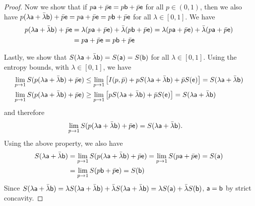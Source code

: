 \begin{mathSection}
\begin{proof}
	Now we show that if  $p\ens[a] + \bar{p} \ens = p \ens[b] + \bar{p} \ens$ for all $p \in (0,1)$, then we also have $p(\lambda\ens[a] + \bar{\lambda}\ens[b]) + \bar{p} \ens = p\ens[a] + \bar{p} \ens = p \ens[b] + \bar{p} \ens$ for all $\lambda \in [0,1]$. We have
	\begin{equation}
		\begin{aligned}
			p(\lambda\ens[a] + \bar{\lambda}\ens[b]) + \bar{p} \ens &= \lambda(p \ens[a] + \bar{p} \ens) + \bar{\lambda}(p\ens[b] + \bar{p} \ens) = \lambda(p \ens[a] + \bar{p} \ens) + \bar{\lambda}(p\ens[a] + \bar{p} \ens) \\
			&= p\ens[a] + \bar{p} \ens = p\ens[b] + \bar{p} \ens 
		\end{aligned}
	\end{equation}
	
	Lastly, we show that $S(\lambda \ens[a] + \bar{\lambda} \ens[b]) = S(\ens[a]) = S(\ens[b])$ for all $\lambda \in [0,1]$. Using the entropy bounds, with $\lambda \in [0,1]$, we have
	\begin{equation}
		\begin{aligned}
			\lim\limits_{p \to 1} S(p(\lambda\ens[a] + \bar{\lambda}\ens[b]) + \bar{p}\ens) &\leq \lim\limits_{p \to 1} \left[ I(p,\bar{p}) + p S(\lambda\ens[a] + \bar{\lambda}\ens[b]) + \bar{p} S(\ens) \right] = S(\lambda\ens[a] + \bar{\lambda}\ens[b]) \\
			\lim\limits_{p \to 1} S(p(\lambda\ens[a] + \bar{\lambda}\ens[b]) + \bar{p}\ens) &\geq \lim\limits_{p \to 1} \left[ p S(\lambda\ens[a] + \bar{\lambda}\ens[b]) + \bar{p} S(\ens) \right] = S(\lambda\ens[a] + \bar{\lambda}\ens[b])
		\end{aligned}
	\end{equation}
	and therefore
	\begin{equation}
		\begin{aligned}		
			\lim\limits_{p \to 1} S(p(\lambda\ens[a] + \bar{\lambda}\ens[b]) + \bar{p}\ens) &= S(\lambda\ens[a] + \bar{\lambda}\ens[b]).
		\end{aligned}
	\end{equation}
	Using the above property, we also have
	\begin{equation}
		\begin{aligned}
			S(\lambda\ens[a] + \bar{\lambda}\ens[b]) &= \lim\limits_{p \to 1} S(p(\lambda\ens[a] + \bar{\lambda}\ens[b]) + \bar{p}\ens) = \lim\limits_{p \to 1} S(p \ens[a] +\bar{p} \ens) = S(\ens[a]) \\
			&= \lim\limits_{p \to 1} S(p \ens[b] +\bar{p} \ens) = S(\ens[b]) \\
		\end{aligned}
	\end{equation}
	Since $S(\lambda\ens[a] + \bar{\lambda}\ens[b]) = \lambda S(\lambda\ens[a] + \bar{\lambda}\ens[b]) + \bar{\lambda} S(\lambda\ens[a] + \bar{\lambda}\ens[b]) = \lambda S(\ens[a]) + \bar{\lambda} S(\ens[b])$, $\ens[a] = \ens[b]$ by strict concavity.
\end{proof}


\end{mathSection}
